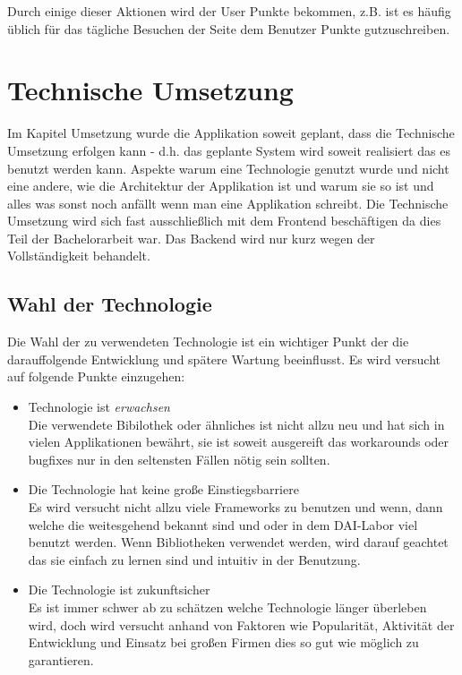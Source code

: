 \documentclass[12pt,twoside]{book}
\begin{document}
Durch einige dieser Aktionen wird der User Punkte bekommen, z.B. ist es häufig üblich für das tägliche Besuchen der Seite dem Benutzer Punkte gutzuschreiben. 


\chapter{Technische Umsetzung} 

Im Kapitel Umsetzung wurde die Applikation soweit geplant, dass die Technische Umsetzung erfolgen kann - d.h. das geplante System wird soweit realisiert das es benutzt werden kann. Aspekte warum eine Technologie genutzt wurde und nicht eine andere, wie die Architektur der Applikation ist und warum sie so ist und alles was sonst noch anfällt wenn man eine Applikation schreibt.
Die Technische Umsetzung wird sich fast ausschließlich mit dem Frontend beschäftigen da dies Teil der Bachelorarbeit war. Das Backend wird nur kurz wegen der Vollständigkeit behandelt.

\section*{Wahl der Technologie}

Die Wahl der zu verwendeten Technologie ist ein wichtiger Punkt der die darauffolgende Entwicklung und spätere Wartung beeinflusst. Es wird versucht auf folgende Punkte einzugehen:

\begin{itemize}
  \item Technologie ist \textit{erwachsen} \\
  Die verwendete Bibilothek oder ähnliches ist nicht allzu neu und hat sich in vielen Applikationen bewährt, sie ist soweit ausgereift das workarounds oder bugfixes nur in den seltensten Fällen nötig sein sollten.
  \item Die Technologie hat keine große Einstiegsbarriere \\
  Es wird versucht nicht allzu viele Frameworks zu benutzen und wenn, dann welche die weitesgehend bekannt sind und oder in dem DAI-Labor viel benutzt werden. Wenn Bibliotheken verwendet werden, wird darauf geachtet das sie einfach zu lernen sind und intuitiv in der Benutzung.
  \item Die Technologie ist zukunftsicher \\
  Es ist immer schwer ab zu schätzen welche Technologie länger überleben wird, doch wird versucht anhand von Faktoren wie Popularität, Aktivität der Entwicklung und Einsatz bei großen Firmen dies so gut wie möglich zu garantieren.
\end{itemize}
\end{document}
